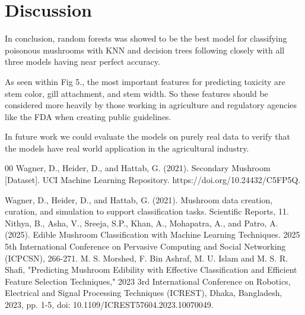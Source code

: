 \documentclass[conference]{IEEEtran}
\begin{document}
\section{Discussion}

In conclusion,  random forests was showed to be the best model for classifying poisonous mushrooms with KNN and decision trees following closely with all three models having near perfect accuracy. 

As seen within Fig 5., the most important features for predicting toxicity are stem color, gill attachment, and stem width. So these features should be considered more heavily by those working in agriculture and regulatory agencies like the FDA when creating public guidelines. 

In future work we could  evaluate the models on purely real data to verify that the models have real world application in the agricultural industry. 

\begin{thebibliography}{00}
 Wagner, D., Heider, D., and Hattab, G. (2021). Secondary Mushroom [Dataset]. UCI Machine Learning Repository. https://doi.org/10.24432/C5FP5Q.

 Wagner, D., Heider, D., and Hattab, G. (2021). Mushroom data creation, curation, and simulation to support classification tasks. Scientific Reports, 11.
 Nithya, B., Asha, V., Sreeja, S.P., Khan, A., Mohapatra, A., and Patro, A. (2025). Edible Mushroom Classification with Machine Learning Techniques. 2025 5th International Conference on Pervasive Computing and Social Networking (ICPCSN), 266-271.
 M. S. Morshed, F. Bin Ashraf, M. U. Islam and M. S. R. Shafi, "Predicting Mushroom Edibility with Effective Classification and Efficient Feature Selection Techniques," 2023 3rd International Conference on Robotics, Electrical and Signal Processing Techniques (ICREST), Dhaka, Bangladesh, 2023, pp. 1-5, doi: 10.1109/ICREST57604.2023.10070049.
\end{thebibliography}
\end{document}
